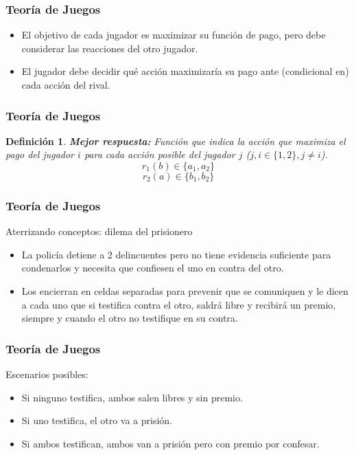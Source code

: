 \documentclass[dvipsnames,table,leqno]{beamer}
\newtheorem{mydef}{Definición}
\newcommand{\peq}[1]{{\scriptscriptstyle{#1}}}
\newcommand{\rp}[1]{\left(#1\right)}
\begin{document}
		\begin{frame}
			\frametitle{Teoría de Juegos}
			\begin{itemize}
				\item El objetivo de cada jugador es maximizar su función de pago, pero debe considerar las reacciones del otro jugador.
				\item El jugador debe decidir qué acción maximizaría su pago ante (condicional en) cada acción del rival.
			\end{itemize}
		\end{frame}	

		\begin{frame}
			\frametitle{Teoría de Juegos}
			\begin{mydef}
				\textbf{Mejor respuesta:} Función que indica la acción que maximiza el pago del jugador $i$ para cada acción posible del jugador $j$ ($j,i\in\{1,2\},j\neq i$). $$r_\peq{1}\rp{b}\in\{a_\peq{1},a_\peq{2}\}$$ $$r_\peq{2}\rp{a}\in\{b_\peq{1},b_\peq{2}\}$$
			\end{mydef}
		\end{frame}	

		\begin{frame}
			\frametitle{Teoría de Juegos}
			Aterrizando conceptos: dilema del prisionero
			\begin{itemize}
				\item La policía detiene a 2 delincuentes pero no tiene evidencia suficiente para condenarlos y necesita que confiesen el uno en contra del otro.
				\item Los encierran en celdas separadas para prevenir que se comuniquen y le dicen a cada uno que si testifica contra el otro, saldrá libre y recibirá un premio, siempre y cuando el otro no testifique en su contra.
			\end{itemize}
		\end{frame}	

		\begin{frame}
			\frametitle{Teoría de Juegos}
			Escenarios posibles:
			\begin{itemize}
				\item Si ninguno testifica, ambos salen libres y sin premio.
				\item Si uno testifica, el otro va a prisión.
				\item Si ambos testifican, ambos van a prisión pero con premio por confesar.
			\end{itemize}
		\end{frame}	
\end{document}
